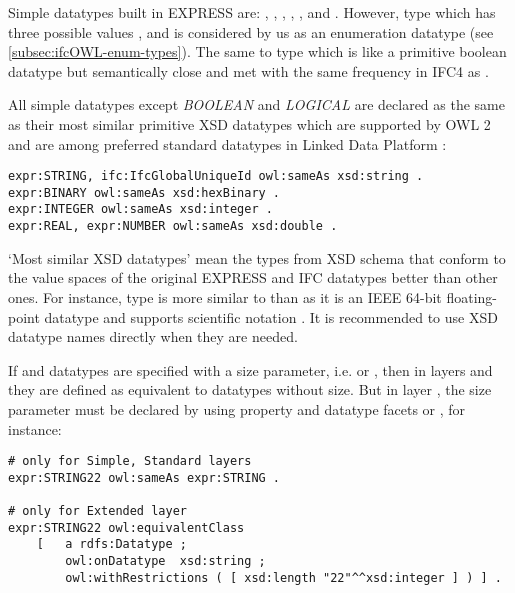 Simple data\-types built in EXPRESS are: , , , , ,  and . However, type  which has three possible values ,  and  is considered by us as an enumeration data\-type (see \ref{subsec:ifcOWL-enum-types}). The same to type  which is like a primitive boolean data\-type but semantically close and met with the same frequency in IFC4 as .

\begin{principle}
All simple data\-types except \emph{BOOLEAN} and \emph{LOGICAL} are declared as the same as their most similar primitive XSD data\-types which are supported by OWL 2 \cite{w3c:owl2-profiles} and are among preferred standard data\-types in Linked Data Platform \cite{w3c:ldp-best-practices}:

\begin{lstlisting}
expr:STRING, ifc:IfcGlobalUniqueId owl:sameAs xsd:string .
expr:BINARY owl:sameAs xsd:hexBinary .
expr:INTEGER owl:sameAs xsd:integer .
expr:REAL, expr:NUMBER owl:sameAs xsd:double .
\end{lstlisting}
\end{principle}

`Most similar XSD data\-types' mean the types from XSD schema that conform to the value spaces of the original EXPRESS and IFC data\-types better than other ones. For instance, type  is more similar to  than  as it is an IEEE 64-bit floating-point data\-type and supports scientific notation \cite{w3c:xsd,datapic:xsd}. It is recommended to use XSD data\-type names directly when they are needed.

\begin{principle}If  and  data\-types are specified with a size parameter, i.e.  or , then in layers \simple{} and \standard{} they are defined as equivalent to data\-types without size. But in layer \extended{}, the size parameter must be declared by using property  and data\-type facets  or  \cite{w3c:owl2-syntax,w3c:xmlschema11-2}, for instance:

\begin{lstlisting}
# only for Simple, Standard layers
expr:STRING22 owl:sameAs expr:STRING .

# only for Extended layer
expr:STRING22 owl:equivalentClass
    [   a rdfs:Datatype ;
        owl:onDatatype  xsd:string ;
        owl:withRestrictions ( [ xsd:length "22"^^xsd:integer ] ) ] .
\end{lstlisting}
\end{principle}

